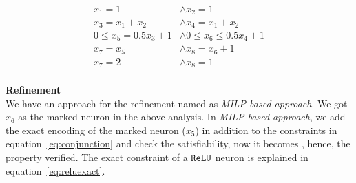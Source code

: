 \begin{equation}
    \begin{aligned}
        x_1 = 1 & \land x_2 = 1 \\
        x_3 = x_1 + x_2 & \land x_4 = x_1 + x_2 \\
        0 \leq x_5 = 0.5x_3 + 1 & \land 0\leq x_6 \leq 0.5x_4 + 1 \\ 
        x_7 = x_5 & \land x_8 = x_6 + 1 \\
        x_7 = 2 & \land x_8 = 1
    \end{aligned}
\label{eq:opt1}
\end{equation}
\\
\textbf{Refinement} \\
We have an approach for the refinement named as {\em MILP-based approach}.
We got $x_6$ as the marked neuron in the above analysis. 
In {\em MILP based approach}, we add the exact encoding of the marked neuron ($x_5$) in addition to the constraints
in equation~\ref{eq:conjunction} and check the satisfiability, now it becomes \unsat{}, hence, the property verified. 
The exact constraint of a $\mathtt{ReLU}${} neuron is explained in equation~\ref{eq:reluexact}. 





